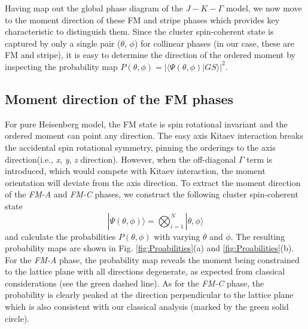 \documentclass[aps,prb,reprint,amsfonts,amsmath,amssymb,showpacs,groupedaddress,superscriptaddress]{revtex4-1}
\begin{document}
Having map out the global phase diagram of the $J-K-\Gamma$ model, we now move to the moment direction of these FM and stripe phases which provides key characteristic to distinguish them. Since the cluster spin-coherent state is captured by only a single pair ($\theta$, $\phi$) for collinear phases (in our case, these are FM and stripe), it is easy to determine the direction of the ordered moment by inspecting the probability map $P(\theta, \phi) = | \langle \Psi (\theta, \phi) | GS \rangle |^2.$

\subsection{Moment direction of the FM phases}
For pure Heisenberg model, the FM state is spin rotational invariant and the ordered moment can point any direction. The easy axis Kitaev interaction breaks the accidental spin rotational symmetry, pinning the orderings to the axis direction(i.e., \textit{x}, \textit{y}, \textit{z} direction). However, when the off-diagonal $\Gamma$ term is introduced, which would compete with Kitaev interaction, the moment orientation will deviate from the axis direction. To extract the moment direction of the \emph{FM-A} and \emph{FM-C} phases, we construct the following cluster spin-coherent state
\begin{equation}
    |\Psi(\theta, \phi) \rangle = \bigotimes_{i=1}^N|\theta,\phi \rangle
\end{equation}
and calculate the probabilities $P(\theta, \phi)$ with varying $\theta$ and $\phi$. The resulting probability maps are shown in Fig. \ref{fig:Proabilities}(a) and \ref{fig:Proabilities}(b). For the \emph{FM-A} phase, the probability map reveals the moment being constrained to the lattice plane with all directions degenerate, as expected from classical considerations (see the green dashed line). As for the \emph{FM-C} phase, the probability is clearly peaked at the direction perpendicular to the lattice plane which is also consistent with our classical analysis (marked by the green solid circle).
\end{document}
